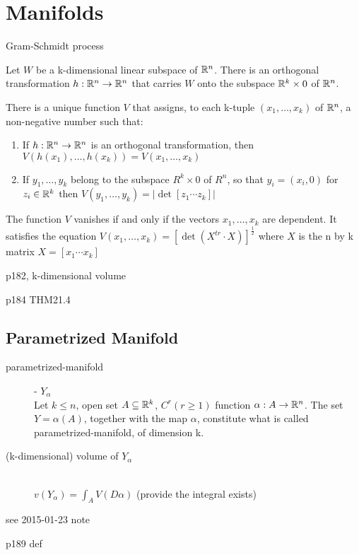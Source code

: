 \section{Manifolds}
\TODO

Gram-Schmidt process


Let $W$ be a k-dimensional linear subspace of ${\mathbb R}^n$.
There is an orthogonal transformation $h:{\mathbb R}^n\to{\mathbb R}^n$ that carries
$W$ onto the subspace ${\mathbb R}^k\times 0$ of ${\mathbb R}^n$.


There is a unique function $V$ that assigns,
to each k-tuple $(x_1,\ldots, x_k)$ of ${\mathbb R}^n$, a non-negative number such that:
\begin{enumerate}
\item If $h:{\mathbb R}^n\to{\mathbb R}^n$ is an orthogonal transformation, then $V(h(x_1),\ldots, h(x_k)) = V(x_1,\ldots, x_k)$
\item If $y_1,\ldots,y_k$ belong to the subspace $R^k\times 0$ of $R^n$, so that $y_i=(x_i, 0)$ for $z_i\in {\mathbb R}^k$ then $V(y_1,\ldots, y_k) = |\det [z_1\cdots z_k]|$
\end{enumerate}
The function $V$ vanishes if and only if the vectors $x_1,\ldots, x_k$ are dependent.
It satisfies the equation $V(x_1,\ldots,x_k)=[\det(X^{tr}\cdot X)]^\frac{1}{2}$
where $X$ is the n by k matrix $X=[x_1\cdots x_k]$

\TODO p182, k-dimensional volume

\TODO p184 THM21.4

\subsection{Parametrized Manifold}
\begin{description}
\item[parametrized-manifold] - $Y_\alpha$\hfill\\
Let $k\leq n$, open set $A\subseteq{\mathbb R}^k$, $C^r(r\geq 1)$ function $\alpha:A\to {\mathbb R}^n$.
The set $Y=\alpha(A)$, together with the map $\alpha$, constitute what is called parametrized-manifold, of dimension k.

\item[(k-dimensional) volume of $Y_\alpha$]\hfill\\
$v(Y_\alpha) = \int_A V(D \alpha)$
(provide the integral exists)
\end{description}

\TODO see 2015-01-23 note

\TODO p189 def